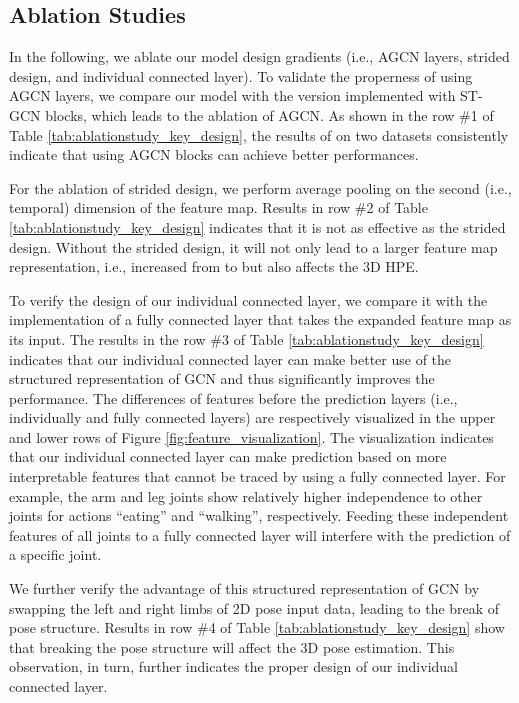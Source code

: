 \documentclass[10pt,twocolumn,letterpaper]{article}
\begin{document}
\subsection{Ablation Studies}
In the following, we ablate our model design gradients (i.e., AGCN layers, strided design, and individual connected layer).
To validate the properness of using AGCN layers, we compare our model with the version implemented with ST-GCN \cite{RN026} blocks, which leads to the ablation of AGCN. As shown in the row \#1 of Table \ref{tab:ablationstudy_key_design}, the results of  on two datasets consistently indicate that using AGCN blocks can achieve better performances. 

For the ablation of strided design, we perform average pooling on the second (i.e., temporal) dimension of the feature map. Results in row \#2 of Table \ref{tab:ablationstudy_key_design} indicates that it is not as effective as the strided design. Without the strided design, it will not only lead to a larger feature map representation, i.e., increased from  to  but also affects the 3D HPE.

To verify the design of our individual connected layer, we compare it with the implementation of a fully connected layer that takes the expanded feature map as its input. The results in the row \#3 of Table \ref{tab:ablationstudy_key_design} indicates that our individual connected layer can make better use of the structured representation of GCN and thus significantly improves the performance. 
The differences of features before the prediction layers (i.e., individually and fully connected layers) are respectively visualized in the upper and lower rows of Figure \ref{fig:feature_visualization}. The visualization indicates that our individual connected layer can make prediction based on more interpretable features that cannot be traced by using a fully connected layer. For example, the arm and leg joints show relatively higher 
independence to other joints for actions ``eating'' and ``walking'', respectively. Feeding these independent features of all joints to a fully connected layer will interfere with the prediction of a specific joint.

We further verify the advantage of this structured representation of GCN by swapping the left and right limbs of 2D pose input data, leading to the break of pose structure. Results in row \#4 of Table \ref{tab:ablationstudy_key_design} show that breaking the pose structure will affect the 3D pose estimation. This observation, in turn, further indicates the proper design of our individual connected layer. 
\end{document}
